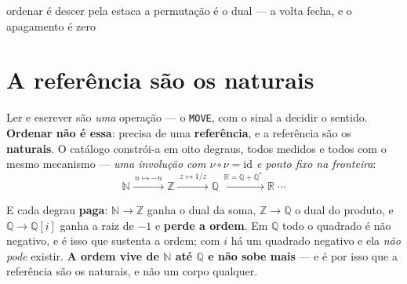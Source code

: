 \documentclass[11pt,a4paper]{article}
\newcommand{\N}{\ensuremath{\mathbb{N}}}
\newcommand{\Z}{\ensuremath{\mathbb{Z}}}
\newcommand{\Q}{\ensuremath{\mathbb{Q}}}
\newcommand{\R}{\ensuremath{\mathbb{R}}}
\begin{document}
       {ordenar é descer pela estaca}
       {a permutação é o dual --- a volta fecha, e o apagamento é zero}
\maketitle

\begin{abstract}
\noindent \textbf{Ler e escrever são uma operação; ordenar não é essa} --- ela precisa de uma
\emph{referência}, e a referência são os \textbf{naturais}, construídos em oito degraus que são
todos involuções. \textbf{Uma sequência é uma régua}, e ordená-la é levá-la ao seu \textbf{ponto fixo} ---
a forma canónica --- de onde se converte para qualquer outra. É esse mapa entre réguas que aqui se
constrói e se valida, com as peças da teoria da dualidade: a \textbf{estaca} $x\mapsto x^{\dagger}$,
a \textbf{Lei 2} $-f=f^{-1}$, a \textbf{bidualidade} $J^{4}=\mathrm{id}$ e o \textbf{trial}. Nenhum
elemento é comparado com outro. \textbf{A permutação é o dual}, e guardá-la torna o processo
\emph{invertível}: a volta é exata e o apagamento é \textbf{zero}. O critério não é a lista sair
crescente --- é a volta fechar.
\end{abstract}

\section{A referência são os naturais}

Ler e escrever são \emph{uma} operação --- o \texttt{MOVE}, com o sinal a decidir o sentido.
\textbf{Ordenar não é essa}: precisa de uma \textbf{referência}, e a referência são os
\textbf{naturais}. O catálogo constrói-a em oito degraus, todos medidos e todos com o mesmo
mecanismo --- \emph{uma involução com $\nu\circ\nu=\mathrm{id}$ e ponto fixo na fronteira}:
\[
  \N \xrightarrow{\;n\mapsto-n\;} \Z
  \xrightarrow{\;z\mapsto 1/z\;} \Q
  \xrightarrow{\;\R=\Q+\Q^{*}\;} \R \;\cdots
\]

\noindent E cada degrau \textbf{paga}: $\N\to\Z$ ganha o dual da soma, $\Z\to\Q$ o dual do
produto, e $\Q\to\Q[i]$ ganha a raiz de $-1$ e \textbf{perde a ordem}. Em $\Q$ todo o quadrado é
não negativo, e é isso que sustenta a ordem; com $i$ há um quadrado negativo e ela \emph{não pode}
existir. \textbf{A ordem vive de $\N$ até $\Q$ e não sobe mais} --- e é por isso que a referência
são os naturais, e não um corpo qualquer.
\end{document}
